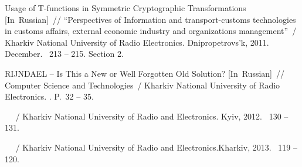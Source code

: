 \begin{thebibliography}{1}
 {Usage of T-functions in Symmetric
  Cryptographic Transformations [In~Russian]}~// {``Perspectives of Information
  and transport-customs technologies in customs affairs, external economic
  industry and organizations management''}~/ {Kharkiv National University of
  Radio Electronics}. \BibDash
\newblock Dnipropetrovs'k, 2011. \BibDash December. \BibDash
{}~213 -- 215. \BibDash
\newblock Section 2.

 {RIJNDAEL -- Is This a
  New or Well Forgotten Old Solution? [In~Russian]}~// {Computer Science and
  Technologies}~/ {Kharkiv National University of Radio Electronics}. \BibDash
{}. \BibDash
\newblock P.~32 -- 35.

~ 
~/ 
Kharkiv National University of Radio and Electronics. \BibDash Kyiv, 2012. ~130 -- 131.

 ~ 
~/ 
Kharkiv National University of Radio and Electronics.\BibDash Kharkiv, 2013. ~119 -- 120.

\end{thebibliography}
\endgroup
